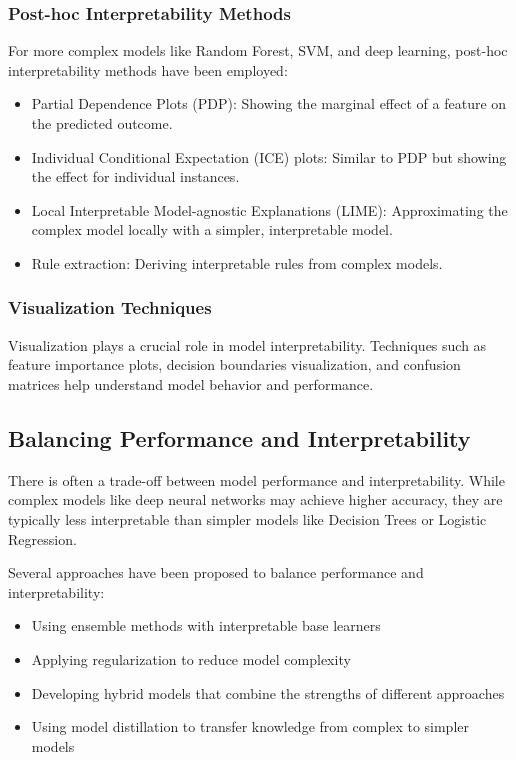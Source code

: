 \documentclass[journal]{IEEEtran}
\begin{document}
\subsubsection{Post-hoc Interpretability Methods}
For more complex models like Random Forest, SVM, and deep learning, post-hoc interpretability methods have been employed:
\begin{itemize}
    \item Partial Dependence Plots (PDP): Showing the marginal effect of a feature on the predicted outcome.
    \item Individual Conditional Expectation (ICE) plots: Similar to PDP but showing the effect for individual instances.
    \item Local Interpretable Model-agnostic Explanations (LIME): Approximating the complex model locally with a simpler, interpretable model.
    \item Rule extraction: Deriving interpretable rules from complex models.
\end{itemize}

\subsubsection{Visualization Techniques}
Visualization plays a crucial role in model interpretability. Techniques such as feature importance plots, decision boundaries visualization, and confusion matrices help understand model behavior and performance.

\subsection{Balancing Performance and Interpretability}
There is often a trade-off between model performance and interpretability. While complex models like deep neural networks may achieve higher accuracy, they are typically less interpretable than simpler models like Decision Trees or Logistic Regression.

Several approaches have been proposed to balance performance and interpretability:
\begin{itemize}
    \item Using ensemble methods with interpretable base learners
    \item Applying regularization to reduce model complexity
    \item Developing hybrid models that combine the strengths of different approaches
    \item Using model distillation to transfer knowledge from complex to simpler models
\end{itemize}
\end{document}
